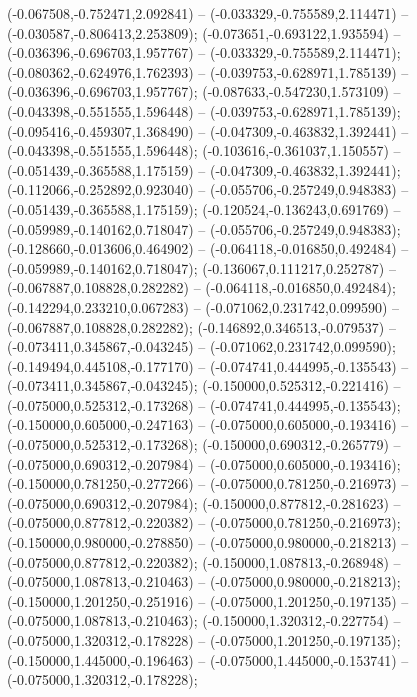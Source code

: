  (-0.067508,-0.752471,2.092841) -- (-0.033329,-0.755589,2.114471) -- (-0.030587,-0.806413,2.253809);
 (-0.073651,-0.693122,1.935594) -- (-0.036396,-0.696703,1.957767) -- (-0.033329,-0.755589,2.114471);
 (-0.080362,-0.624976,1.762393) -- (-0.039753,-0.628971,1.785139) -- (-0.036396,-0.696703,1.957767);
 (-0.087633,-0.547230,1.573109) -- (-0.043398,-0.551555,1.596448) -- (-0.039753,-0.628971,1.785139);
 (-0.095416,-0.459307,1.368490) -- (-0.047309,-0.463832,1.392441) -- (-0.043398,-0.551555,1.596448);
 (-0.103616,-0.361037,1.150557) -- (-0.051439,-0.365588,1.175159) -- (-0.047309,-0.463832,1.392441);
 (-0.112066,-0.252892,0.923040) -- (-0.055706,-0.257249,0.948383) -- (-0.051439,-0.365588,1.175159);
 (-0.120524,-0.136243,0.691769) -- (-0.059989,-0.140162,0.718047) -- (-0.055706,-0.257249,0.948383);
 (-0.128660,-0.013606,0.464902) -- (-0.064118,-0.016850,0.492484) -- (-0.059989,-0.140162,0.718047);
 (-0.136067,0.111217,0.252787) -- (-0.067887,0.108828,0.282282) -- (-0.064118,-0.016850,0.492484);
 (-0.142294,0.233210,0.067283) -- (-0.071062,0.231742,0.099590) -- (-0.067887,0.108828,0.282282);
 (-0.146892,0.346513,-0.079537) -- (-0.073411,0.345867,-0.043245) -- (-0.071062,0.231742,0.099590);
 (-0.149494,0.445108,-0.177170) -- (-0.074741,0.444995,-0.135543) -- (-0.073411,0.345867,-0.043245);
 (-0.150000,0.525312,-0.221416) -- (-0.075000,0.525312,-0.173268) -- (-0.074741,0.444995,-0.135543);
 (-0.150000,0.605000,-0.247163) -- (-0.075000,0.605000,-0.193416) -- (-0.075000,0.525312,-0.173268);
 (-0.150000,0.690312,-0.265779) -- (-0.075000,0.690312,-0.207984) -- (-0.075000,0.605000,-0.193416);
 (-0.150000,0.781250,-0.277266) -- (-0.075000,0.781250,-0.216973) -- (-0.075000,0.690312,-0.207984);
 (-0.150000,0.877812,-0.281623) -- (-0.075000,0.877812,-0.220382) -- (-0.075000,0.781250,-0.216973);
 (-0.150000,0.980000,-0.278850) -- (-0.075000,0.980000,-0.218213) -- (-0.075000,0.877812,-0.220382);
 (-0.150000,1.087813,-0.268948) -- (-0.075000,1.087813,-0.210463) -- (-0.075000,0.980000,-0.218213);
 (-0.150000,1.201250,-0.251916) -- (-0.075000,1.201250,-0.197135) -- (-0.075000,1.087813,-0.210463);
 (-0.150000,1.320312,-0.227754) -- (-0.075000,1.320312,-0.178228) -- (-0.075000,1.201250,-0.197135);
 (-0.150000,1.445000,-0.196463) -- (-0.075000,1.445000,-0.153741) -- (-0.075000,1.320312,-0.178228);
